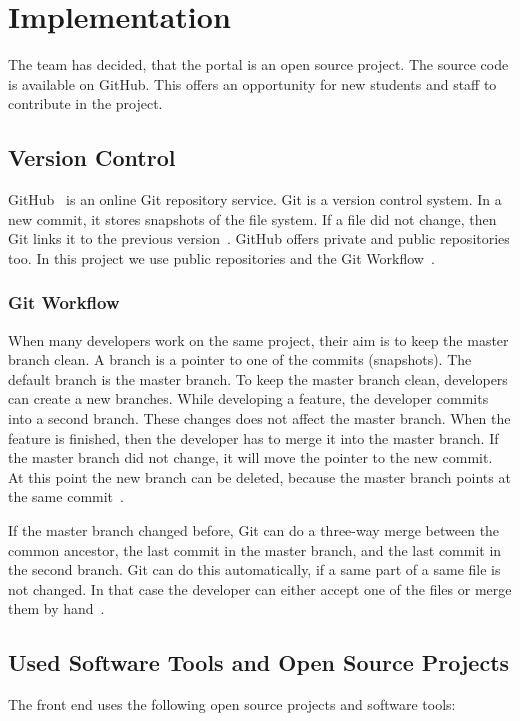 \chapter{Implementation}

The team has decided, that the portal is an open source project. The source code is available on GitHub. This offers an opportunity for new students and staff to contribute in the project.


\section{Version Control}
GitHub~\cite{github} is an online Git repository service. Git is a version control system. In a new commit, it stores snapshots of the file system. If a file did not change, then Git links it to the previous version~\cite{git}. GitHub offers private and public repositories too. In this project we use public repositories and the Git Workflow~\cite{git-workflow}. 

\subsection{Git Workflow}
When many developers work on the same project, their aim is to keep the master branch clean. A branch is a pointer to one of the commits (snapshots). The default branch is the master branch. To keep the master branch clean, developers can create a new branches. While developing a feature, the developer commits into a second branch. These changes does not affect the master branch. When the feature is finished, then the developer has to merge it into the master branch. If the master branch did not change, it will move the pointer to the new commit. At this point the new branch can be deleted, because the master branch points at the same commit~\cite{git-workflow2}.

If the master branch changed before, Git can do a three-way merge between the common ancestor, the last commit in the master branch, and the last commit in the second branch. Git can do this automatically, if a same part of a same file is not changed. In that case the developer can either accept one of the files or merge them by hand~\cite{git-workflow2}.

\section{Used Software Tools and Open Source Projects}
The front end uses the following open source projects and software tools:

